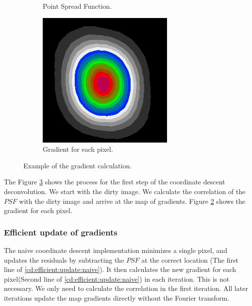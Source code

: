 \begin{figure}[h]
\begin{subfigure}[b]{0.3\linewidth}
		\caption{Point Spread Function.}
		\label{cd:efficient:gradients:psf}
	\end{subfigure}
	\begin{subfigure}[b]{0.3\linewidth}
		\includegraphics[width=\linewidth]{./chapters/03.distribution/simulated/gradients.png}
		\caption{Gradient for each pixel.}
		\label{cd:efficient:gradients:gradients}
	\end{subfigure}
	
	\caption{Example of the gradient calculation.}
	\label{cd:efficient:gradients:figure}
\end{figure}

The Figure \ref{cd:efficient:gradients:figure} shows the process for the first step of the coordinate descent deconvolution. We start with the dirty image. We calculate the correlation of the $PSF$ with the dirty image and arrive at the map of gradients. Figure \ref{cd:efficient:gradients:gradients} shows the gradient for each pixel.

\subsubsection{Efficient update of gradients}
The naive coordinate descent implementation minimizes a single pixel, and updates the residuals by subtracting the $PSF$ at the correct location (The first line of \eqref{cd:efficient:update:naive}). It then calculates the new gradient for each pixel(Second line of \eqref{cd:efficient:update:naive}) in each iteration. This is not necessary. We only need to calculate the correlation in the first iteration. All later iterations update the map gradients directly without the Fourier transform.

